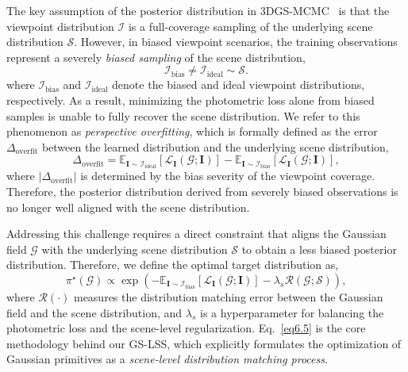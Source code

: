 \documentclass[lettersize,journal]{IEEEtran}
\begin{document}
The key assumption of the posterior distribution in 3DGS-MCMC~\cite{mcmc} is that the viewpoint distribution $\mathcal{I}$ is a full-coverage sampling of the underlying scene distribution $\mathcal{S}$. However, in biased viewpoint scenarios, the training observations represent a severely \emph{biased sampling} of the scene distribution,
\begin{equation}
    \mathcal{I}_{\text{bias}} \neq \mathcal{I}_{\text{ideal}} \sim \mathcal{S}.
    \label{eq5}
\end{equation}
where $\mathcal{I}_{\text{bias}}$ and $\mathcal{I}_{\text{ideal}}$ denote the biased and ideal viewpoint distributions, respectively.
As a result, minimizing the photometric loss alone from biased samples is unable to fully recover the scene distribution. We refer to this phenomenon as \emph{perspective overfitting}, which is formally defined as the error $\Delta_{\text{overfit}}$ between the learned distribution and the underlying scene distribution,
\begin{equation}
    \Delta_{\text{overfit}} = \mathbb{E}_{\mathbf{I} \sim \mathcal{I}_{\text{ideal}}} \left[ \mathcal{L}_{\mathbf{I}} (\mathcal{G}; \mathbf{I}) \right] - \mathbb{E}_{\mathbf{I} \sim \mathcal{I}_{\text{bias}}} \left[ \mathcal{L}_{\mathbf{I}} (\mathcal{G}; \mathbf{I}) \right],
    \label{eq5.1}
\end{equation}
where $\vert \Delta_{\text{overfit}} \vert$ is determined by the bias severity of the viewpoint coverage. Therefore, the posterior distribution derived from severely biased observations is no longer well aligned with the scene distribution.

Addressing this challenge requires a direct constraint that aligns the Gaussian field $\mathcal{G}$ with the underlying scene distribution $\mathcal{S}$ to obtain a less biased posterior distribution. Therefore, we define the optimal target distribution as,
\begin{equation}
    \pi^{\star} (\mathcal{G}) \propto \exp \left( - \mathbb{E}_{\mathbf{I}\sim\mathcal{I}_{\text{bias}}}\!\left[\mathcal{L}_{\mathbf{I}}(\mathcal{G};\mathbf{I})\right] - \lambda_{s} \mathcal{R}(\mathcal{G};\mathcal{S}) \right),
    \label{eq6.5}
\end{equation}
where $\mathcal{R}(\cdot)$ measures the distribution matching error between the Gaussian field and the scene distribution, and $\lambda_{s}$ is a hyperparameter for balancing the photometric loss and the scene-level regularization. Eq.~\ref{eq6.5} is the core methodology behind our GS-LSS, which explicitly formulates the optimization of Gaussian primitives as a \emph{scene-level distribution matching process}.
\end{document}
